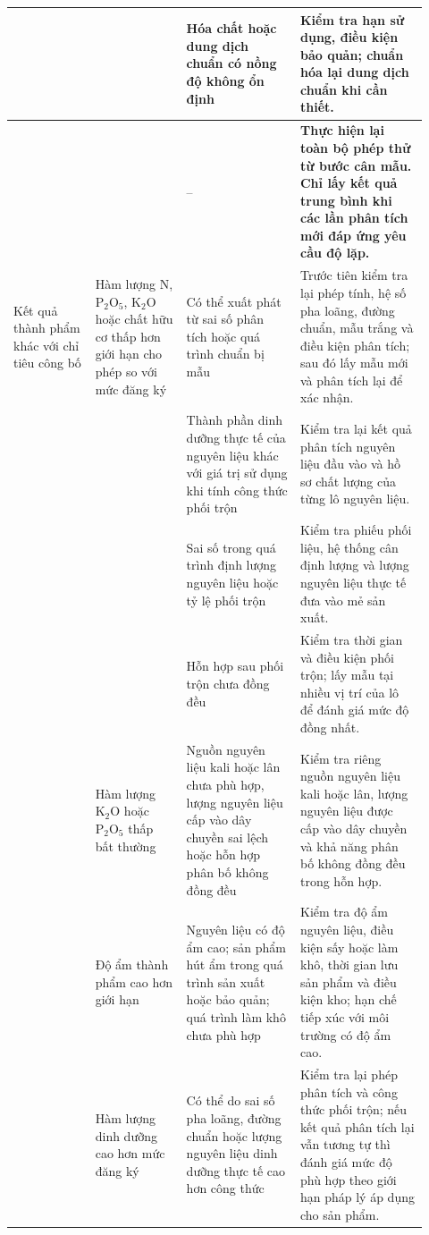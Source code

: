 \begin{landscape}
\begin{longtable}{|>{\raggedright\arraybackslash}p{0.18\linewidth}|>{\raggedright\arraybackslash}p{0.20\linewidth}|>{\raggedright\arraybackslash}p{0.25\linewidth}|>{\raggedright\arraybackslash}p{0.29\linewidth}|}
&
& Hóa chất hoặc dung dịch chuẩn có nồng độ không ổn định
& Kiểm tra hạn sử dụng, điều kiện bảo quản; chuẩn hóa lại dung dịch chuẩn khi cần thiết. \\
\hline

&
& --
& \textbf{Thực hiện lại toàn bộ phép thử từ bước cân mẫu. Chỉ lấy kết quả trung bình khi các lần phân tích mới đáp ứng yêu cầu độ lặp.} \\
\hline

Kết quả thành phẩm khác với chỉ tiêu công bố
& Hàm lượng N, \(\mathrm{P_2O_5}\), \(\mathrm{K_2O}\) hoặc chất hữu cơ thấp hơn giới hạn cho phép so với mức đăng ký
& Có thể xuất phát từ sai số phân tích hoặc quá trình chuẩn bị mẫu
& Trước tiên kiểm tra lại phép tính, hệ số pha loãng, đường chuẩn, mẫu trắng và điều kiện phân tích; sau đó lấy mẫu mới và phân tích lại để xác nhận. \\
\hline

&
& Thành phần dinh dưỡng thực tế của nguyên liệu khác với giá trị sử dụng khi tính công thức phối trộn
& Kiểm tra lại kết quả phân tích nguyên liệu đầu vào và hồ sơ chất lượng của từng lô nguyên liệu. \\
\hline

&
& Sai số trong quá trình định lượng nguyên liệu hoặc tỷ lệ phối trộn
& Kiểm tra phiếu phối liệu, hệ thống cân định lượng và lượng nguyên liệu thực tế đưa vào mẻ sản xuất. \\
\hline

&
& Hỗn hợp sau phối trộn chưa đồng đều
& Kiểm tra thời gian và điều kiện phối trộn; lấy mẫu tại nhiều vị trí của lô để đánh giá mức độ đồng nhất. \\
\hline

& Hàm lượng \(\mathrm{K_2O}\) hoặc \(\mathrm{P_2O_5}\) thấp bất thường
& Nguồn nguyên liệu kali hoặc lân chưa phù hợp, lượng nguyên liệu cấp vào dây chuyền sai lệch hoặc hỗn hợp phân bố không đồng đều
& Kiểm tra riêng nguồn nguyên liệu kali hoặc lân, lượng nguyên liệu được cấp vào dây chuyền và khả năng phân bố không đồng đều trong hỗn hợp. \\
\hline

& Độ ẩm thành phẩm cao hơn giới hạn
& Nguyên liệu có độ ẩm cao; sản phẩm hút ẩm trong quá trình sản xuất hoặc bảo quản; quá trình làm khô chưa phù hợp
& Kiểm tra độ ẩm nguyên liệu, điều kiện sấy hoặc làm khô, thời gian lưu sản phẩm và điều kiện kho; hạn chế tiếp xúc với môi trường có độ ẩm cao. \\
\hline

& Hàm lượng dinh dưỡng cao hơn mức đăng ký
& Có thể do sai số pha loãng, đường chuẩn hoặc lượng nguyên liệu dinh dưỡng thực tế cao hơn công thức
& Kiểm tra lại phép phân tích và công thức phối trộn; nếu kết quả phân tích lại vẫn tương tự thì đánh giá mức độ phù hợp theo giới hạn pháp lý áp dụng cho sản phẩm. \\
\hline


\end{longtable}
\end{landscape}
